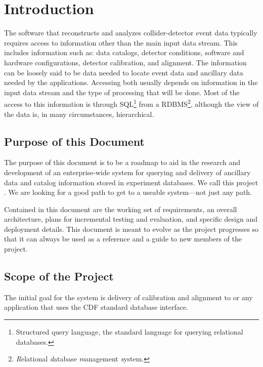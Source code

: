 \chapter{Introduction}

The software that reconstructs and analyzes 
collider-detector event data 
typically requires access to information other than
the main input data stream. 
This includes information such as: 
data catalogs, 
detector conditions,
software and hardware configurations,
detector calibration, 
and alignment.
The information can be loosely said
to be data
needed to locate 
event data and ancillary data needed
by the applications. Accessing both usually depends on information in
the input data stream and the type of processing that will be
done. Most of the access to this information is through
SQL\footnote{Structured query language, the standard language for querying relational databases.}
from a
RDBMS\footnote{\textit{R}elational \textit{d}atabase \textit{m}anagement \textit{s}ystem.},
although the view of the data is, in many circumstances,
hierarchical.

\section{Purpose of this Document}

The purpose of this document 
is to be a roadmap
to aid in the research and development
of an enterprise-wide system
for querying and delivery of ancillary data and catalog information 
stored in experiment databases.
We call this project \frontier.
We are looking for a good path to get to a useable system---not just any
path.

Contained in this document are the working set of requirements,
an overall architecture, plans for incremental testing and evaluation,
and specific design and deployment details. This document is meant to
evolve as the project progresses so that it can always be used as a
reference and a guide to new members of the project.


\section{Scope of the Project}

The initial goal
for the system is delivery 
of calibration and alignment to 
or any application that uses the CDF
standard \cpp database interface.

